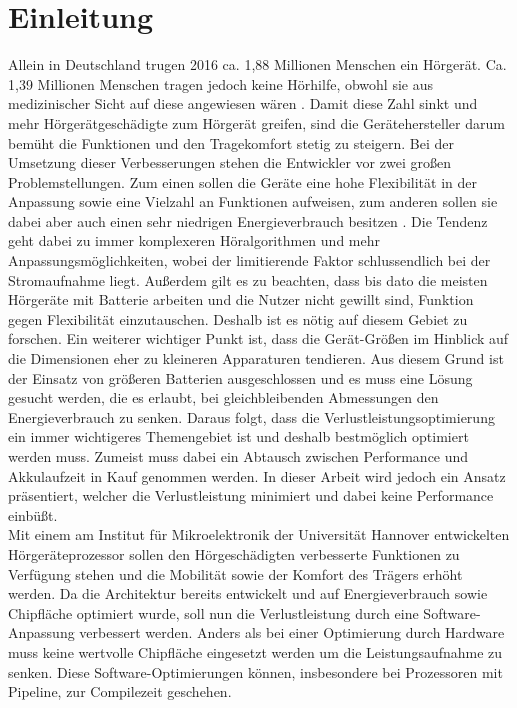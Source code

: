
\thispagestyle{empty}
%
\chapter{Einleitung}
\label{chap:introduction}
Allein in Deutschland trugen 2016 ca. 1,88 Millionen Menschen ein Hörgerät. Ca. 1,39 Millionen Menschen tragen jedoch keine Hörhilfe, obwohl sie aus medizinischer Sicht auf diese angewiesen wären \cite{statistica}. Damit diese Zahl sinkt und mehr Hörgerätgeschädigte zum Hörgerät greifen, sind die Gerätehersteller darum bemüht die Funktionen und den Tragekomfort stetig zu steigern.
Bei der Umsetzung dieser Verbesserungen stehen die Entwickler vor zwei großen Problemstellungen. Zum einen sollen die Geräte eine hohe Flexibilität in der Anpassung sowie eine Vielzahl an Funktionen aufweisen, zum anderen sollen sie dabei aber auch einen sehr niedrigen Energieverbrauch besitzen \cite{lee2007low}. Die Tendenz geht dabei zu immer komplexeren Höralgorithmen und mehr Anpassungsmöglichkeiten, wobei der limitierende Faktor schlussendlich bei der Stromaufnahme liegt.
Außerdem gilt es zu beachten, dass bis dato die meisten Hörgeräte mit Batterie arbeiten und die Nutzer nicht gewillt sind, Funktion gegen Flexibilität einzutauschen. Deshalb ist es nötig auf diesem Gebiet zu forschen. Ein weiterer wichtiger Punkt ist, dass die Gerät-Größen im Hinblick auf die Dimensionen eher zu kleineren Apparaturen tendieren. Aus diesem Grund ist der Einsatz von größeren Batterien ausgeschlossen und es muss eine Lösung gesucht werden, die es erlaubt, bei gleichbleibenden Abmessungen den Energieverbrauch zu senken. Daraus folgt, dass die Verlustleistungsoptimierung ein immer wichtigeres Themengebiet ist und deshalb bestmöglich optimiert werden muss. 
Zumeist muss dabei ein Abtausch zwischen Performance und Akkulaufzeit in Kauf genommen werden. In dieser Arbeit wird jedoch ein Ansatz präsentiert, welcher die Verlustleistung minimiert und dabei keine Performance einbüßt.\\
Mit einem am Institut für Mikroelektronik der Universität Hannover entwickelten Hörgeräteprozessor sollen den Hörgeschädigten verbesserte Funktionen zu Verfügung stehen und die Mobilität sowie der Komfort des Trägers erhöht werden. Da die Architektur bereits entwickelt und auf Energieverbrauch sowie Chipfläche optimiert wurde, soll nun die Verlustleistung durch eine Software-Anpassung verbessert werden. Anders als bei einer Optimierung durch Hardware muss keine wertvolle Chipfläche eingesetzt werden um die Leistungsaufnahme zu senken. Diese Software-Optimierungen können, insbesondere bei Prozessoren mit Pipeline, zur Compilezeit geschehen.\\
